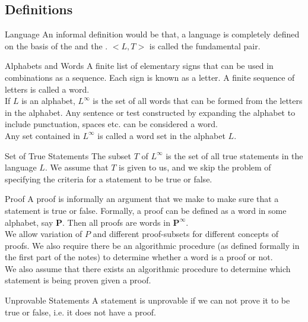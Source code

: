\documentclass[openany]{book}
\begin{document}
\subsection{Definitions}
\begin{mydefinition}{Language}
    An informal definition would be that, a language is completely defined on the basis of the  and the . $<L, T>$ is called the fundamental pair.
\end{mydefinition}
\begin{mydefinition}{Alphabets and Words}
        A finite list of elementary signs that can be used in combinations as a sequence. Each sign is known as a letter. A finite sequence of letters is called a word.  \\
        If $L$ is an alphabet, $L^{\infty}$ is the set of all words that can be formed from the letters in the alphabet. Any sentence or test constructed by expanding the alphabet to include punctuation, spaces etc. can be considered a word. \\
        Any set contained in $L^{\infty}$ is called a word set in the alphabet $L$.   
\end{mydefinition}
\begin{mydefinition}{Set of True Statements}
The subset $T$ of $L^{\infty}$ is the set of all true statements in the language $L$. We assume that $T$ is given to us, and we skip the problem of specifying the criteria for a statement to be true or false. \\
\end{mydefinition}
\begin{mydefinition}{Proof}
    A proof is informally an argument that we make to make sure that a statement is true or false. Formally, a proof can be defined as a word in some alphabet, say \textbf{P}. Then all proofs are words in $\textbf{P}^{\infty}$. \\
    We allow variation of $P$ and different proof-subsets for different concepts of proofs. We also require there be an algorithmic procedure (as defined formally in the first part of the notes) to determine whether a word is a proof or not.\\
    We also assume that there exists an algorithmic procedure to determine which statement is being proven given a proof. 
\end{mydefinition}
\begin{mydefinition}{Unprovable Statements}
    A statement is unprovable if we can not prove it to be true or false, i.e. it does not have a proof. 
\end{mydefinition}
\end{document}
